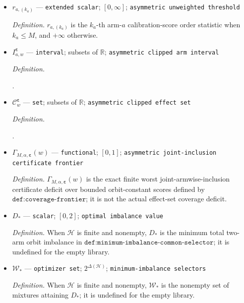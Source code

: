\documentclass{article}
\begin{document}
\begin{itemize}
  \item \(r_{a,(k_a)}\) --- \texttt{extended scalar}; \([0,\infty]\); \texttt{asymmetric unweighted threshold}
  \par\smallskip\noindent\emph{Definition.} \(r_{a,(k_a)}\) is the \(k_a\)-th arm-\(a\) calibration-score order statistic when \(k_a\le M\), and \(+\infty\) otherwise.
  \item \(I^{\boldsymbol\varepsilon}_{a,w}\) --- \texttt{interval}; subsets of \(\mathbb R\); \texttt{asymmetric clipped arm interval}
  \par\smallskip\noindent\emph{Definition.} \par\noindent {}\par\noindent.
  \item \(\mathcal C^{\boldsymbol\varepsilon}_w\) --- \texttt{set}; subsets of \(\mathbb R\); \texttt{asymmetric clipped effect set}
  \par\smallskip\noindent\emph{Definition.} \par\noindent {}\par\noindent.
  \item \(\Gamma_{M,\alpha,\boldsymbol\varepsilon}(w)\) --- \texttt{functional}; \([0,1]\); \texttt{asymmetric joint-\allowbreak{}inclusion certificate frontier}
  \par\smallskip\noindent\emph{Definition.} \(\Gamma_{M,\alpha,\boldsymbol\varepsilon}(w)\) is the exact finite worst joint-armwise-inclusion certificate deficit over bounded orbit-constant scores defined by \(\texttt{def:coverage-frontier}\); it is not the actual effect-set coverage deficit.
  \item \(D_*\) --- \texttt{scalar}; \([0,2]\); \texttt{optimal imbalance value}
  \par\smallskip\noindent\emph{Definition.} When \(\mathcal H\) is finite and nonempty, \(D_*\) is the minimum total two-arm orbit imbalance in \(\texttt{def:minimum-imbalance-common-selector}\); it is undefined for the empty library.
  \item \(\mathcal W_*\) --- \texttt{optimizer set}; \(2^{\Delta(\mathcal H)}\); \texttt{minimum-\allowbreak{}imbalance selectors}
  \par\smallskip\noindent\emph{Definition.} When \(\mathcal H\) is finite and nonempty, \(\mathcal W_*\) is the nonempty set of mixtures attaining \(D_*\); it is undefined for the empty library.

\end{itemize}
\end{document}

